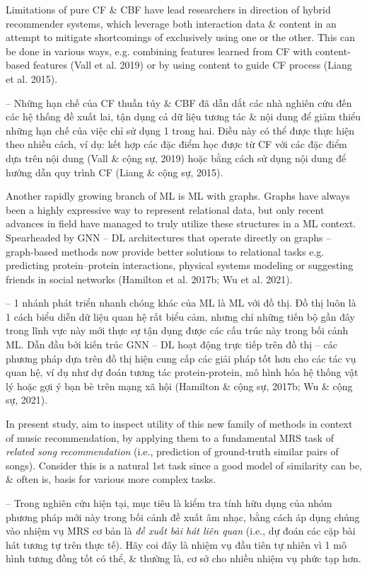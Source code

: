 \documentclass{article}
\begin{document}
\begin{itemize}
    Limitations of pure CF \& CBF have lead researchers in direction of hybrid recommender systems, which leverage both interaction data \& content in an attempt to mitigate shortcomings of exclusively using one or the other. This can be done in various ways, e.g. combining features learned from CF with content-based features (Vall et al. 2019) or by using content to guide CF process (Liang et al. 2015).

    -- Những hạn chế của CF thuần túy \& CBF đã dẫn dắt các nhà nghiên cứu đến các hệ thống đề xuất lai, tận dụng cả dữ liệu tương tác \& nội dung để giảm thiểu những hạn chế của việc chỉ sử dụng 1 trong hai. Điều này có thể được thực hiện theo nhiều cách, ví dụ: kết hợp các đặc điểm học được từ CF với các đặc điểm dựa trên nội dung (Vall \& cộng sự, 2019) hoặc bằng cách sử dụng nội dung để hướng dẫn quy trình CF (Liang \& cộng sự, 2015).

    Another rapidly growing branch of ML is ML with graphs. Graphs have always been a highly expressive way to represent relational data, but only recent advances in field have managed to truly utilize these structures in a ML context. Spearheaded by GNN -- DL architectures that operate directly on graphs -- graph-based methods now provide better solutions to relational tasks e.g. predicting protein--protein interactions, physical systems modeling or suggesting friends in social networks (Hamilton et al. 2017b; Wu et al. 2021).

    -- 1 nhánh phát triển nhanh chóng khác của ML là ML với đồ thị. Đồ thị luôn là 1 cách biểu diễn dữ liệu quan hệ rất biểu cảm, nhưng chỉ những tiến bộ gần đây trong lĩnh vực này mới thực sự tận dụng được các cấu trúc này trong bối cảnh ML. Dẫn đầu bởi kiến trúc GNN -- DL hoạt động trực tiếp trên đồ thị -- các phương pháp dựa trên đồ thị hiện cung cấp các giải pháp tốt hơn cho các tác vụ quan hệ, ví dụ như dự đoán tương tác protein-protein, mô hình hóa hệ thống vật lý hoặc gợi ý bạn bè trên mạng xã hội (Hamilton \& cộng sự, 2017b; Wu \& cộng sự, 2021).

    In present study, aim to inspect utility of this new family of methods in context of music recommendation, by applying them to a fundamental MRS task of {\it related song recommendation} (i.e., prediction of ground-truth similar pairs of songs). Consider this is a natural 1st task since a good model of similarity can be, \& often is, basis for various more complex tasks.

    -- Trong nghiên cứu hiện tại, mục tiêu là kiểm tra tính hữu dụng của nhóm phương pháp mới này trong bối cảnh đề xuất âm nhạc, bằng cách áp dụng chúng vào nhiệm vụ MRS cơ bản là {\it đề xuất bài hát liên quan} (i.e., dự đoán các cặp bài hát tương tự trên thực tế). Hãy coi đây là nhiệm vụ đầu tiên tự nhiên vì 1 mô hình tương đồng tốt có thể, \& thường là, cơ sở cho nhiều nhiệm vụ phức tạp hơn.


\end{itemize}
\end{document}
